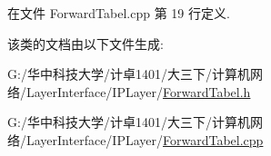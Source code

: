在文件 Forward\+Tabel.\+cpp 第 19 行定义.



该类的文档由以下文件生成\+:\begin{DoxyCompactItemize}
\item 
G\+:/华中科技大学/计卓1401/大三下/计算机网络/\+Layer\+Interface/\+I\+P\+Layer/\hyperlink{_forward_tabel_8h}{Forward\+Tabel.\+h}\item 
G\+:/华中科技大学/计卓1401/大三下/计算机网络/\+Layer\+Interface/\+I\+P\+Layer/\hyperlink{_forward_tabel_8cpp}{Forward\+Tabel.\+cpp}\end{DoxyCompactItemize}
